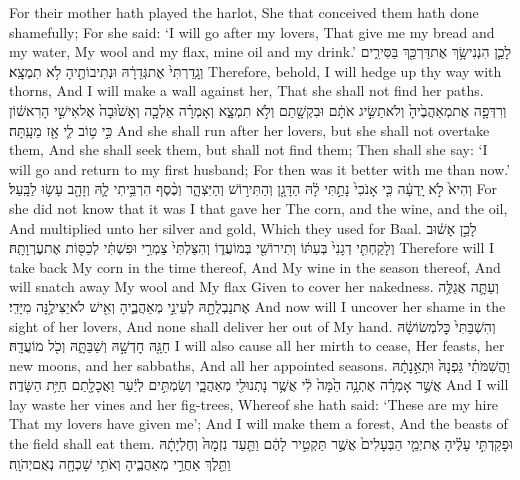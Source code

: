 {For their mother hath played the harlot, She that conceived them hath done shamefully; For she said: ‘I will go after my lovers, That give me my bread and my water, My wool and my flax, mine oil and my drink.’}
{לָכֵ֛ן הִנְנִי\maqqaf שָׂ֥ךְ אֶת\maqqaf דַּרְכֵּ֖ךְ בַּסִּירִ֑ים וְגָֽדַרְתִּי֙ אֶת\maqqaf גְּדֵרָ֔הּ וּנְתִיבוֹתֶ֖יהָ לֹ֥א תִמְצָֽא׃}
{Therefore, behold, I will hedge up thy way with thorns, And I will make a wall against her, That she shall not find her paths.}
{וְרִדְּפָ֤ה אֶת\maqqaf מְאַהֲבֶ֙יהָ֙ וְלֹא\maqqaf תַשִּׂ֣יג אֹתָ֔ם וּבִקְשָׁ֖תַם וְלֹ֣א תִמְצָ֑א וְאָמְרָ֗ה אֵלְכָ֤ה וְאָשׁ֙וּבָה֙ אֶל\maqqaf אִישִׁ֣י הָרִאשׁ֔וֹן כִּ֣י ט֥וֹב לִ֛י אָ֖ז מֵעָֽתָּה׃}
{And she shall run after her lovers, but she shall not overtake them, And she shall seek them, but shall not find them; Then shall she say: ‘I will go and return to my first husband; For then was it better with me than now.’}
{וְהִיא֙ לֹ֣א יָֽדְעָ֔ה כִּ֤י אָנֹכִי֙ נָתַ֣תִּי לָ֔הּ הַדָּגָ֖ן וְהַתִּיר֣וֹשׁ וְהַיִּצְהָ֑ר וְכֶ֨סֶף הִרְבֵּ֥יתִי לָ֛הּ וְזָהָ֖ב עָשׂ֥וּ לַבָּֽעַל׃}
{For she did not know that it was I that gave her The corn, and the wine, and the oil, And multiplied unto her silver and gold, Which they used for Baal.}
{לָכֵ֣ן אָשׁ֔וּב וְלָקַחְתִּ֤י דְגָנִי֙ בְּעִתּ֔וֹ וְתִירוֹשִׁ֖י בְּמוֹעֲד֑וֹ וְהִצַּלְתִּי֙ צַמְרִ֣י וּפִשְׁתִּ֔י לְכַסּ֖וֹת אֶת\maqqaf עֶרְוָתָֽהּ׃}
{Therefore will I take back My corn in the time thereof, And My wine in the season thereof, And will snatch away My wool and My flax Given to cover her nakedness.}
{וְעַתָּ֛ה אֲגַלֶּ֥ה אֶת\maqqaf נַבְלֻתָ֖הּ לְעֵינֵ֣י מְאַהֲבֶ֑יהָ וְאִ֖ישׁ לֹא\maqqaf יַצִּילֶ֥נָּה מִיָּדִֽי׃}
{And now will I uncover her shame in the sight of her lovers, And none shall deliver her out of My hand.}
{וְהִשְׁבַּתִּי֙ כׇּל\maqqaf מְשׂוֹשָׂ֔הּ חַגָּ֖הּ חׇדְשָׁ֣הּ וְשַׁבַּתָּ֑הּ וְכֹ֖ל מוֹעֲדָֽהּ׃}
{I will also cause all her mirth to cease, Her feasts, her new moons, and her sabbaths, And all her appointed seasons.}
{וַהֲשִׁמֹּתִ֗י גַּפְנָהּ֙ וּתְאֵ֣נָתָ֔הּ אֲשֶׁ֣ר אָמְרָ֗ה אֶתְנָ֥ה הֵ֙מָּה֙ לִ֔י אֲשֶׁ֥ר נָתְנוּ\maqqaf לִ֖י מְאַהֲבָ֑י וְשַׂמְתִּ֣ים לְיַ֔עַר וַאֲכָלָ֖תַם חַיַּ֥ת הַשָּׂדֶֽה׃}
{And I will lay waste her vines and her fig-trees, Whereof she hath said: ‘These are my hire That my lovers have given me’; And I will make them a forest, And the beasts of the field shall eat them.}
{וּפָקַדְתִּ֣י עָלֶ֗יהָ אֶת\maqqaf יְמֵ֤י הַבְּעָלִים֙ אֲשֶׁ֣ר תַּקְטִ֣יר לָהֶ֔ם וַתַּ֤עַד נִזְמָהּ֙ וְחֶלְיָתָ֔הּ וַתֵּ֖לֶךְ אַחֲרֵ֣י מְאַהֲבֶ֑יהָ וְאֹתִ֥י שָׁכְחָ֖ה נְאֻם\maqqaf יְהֹוָֽה׃ \setuma }
